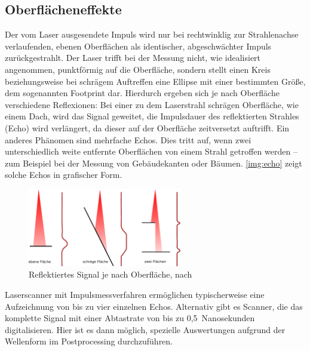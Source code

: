 \documentclass[a4paper,12pt,bibliography=totoc, listof=totoc,titlepage,pointlessnumbers]{scrreprt}
\begin{document}
\subsection{Oberflächeneffekte}
Der vom Laser ausgesendete Impuls wird nur bei rechtwinklig zur Strahlenachse verlaufenden, ebenen Oberflächen als identischer, abgeschwächter Impuls zurückgestrahlt. Der Laser trifft bei der Messung nicht, wie idealisiert angenommen, punktförmig auf die Oberfläche, sondern stellt einen Kreis beziehungsweise bei schrägem Auftreffen eine Ellipse mit einer bestimmten Größe, dem sogenannten Footprint dar. Hierdurch ergeben sich je nach Oberfläche verschiedene Reflexionen: Bei einer zu dem Laserstrahl schrägen Oberfläche, wie einem Dach, wird das Signal geweitet, die Impulsdauer des reflektierten Strahles (Echo) wird verlängert, da dieser auf der Oberfläche zeitversetzt auftrifft. Ein anderes Phänomen sind mehrfache Echos. Dies tritt auf, wenn zwei unterschiedlich weite entfernte Oberflächen von einem Strahl getroffen werden -- zum Beispiel bei der Messung von Gebäudekanten oder Bäumen. \autoref{img:echo} zeigt solche Echos in grafischer Form. \citep[S. 28]{beraldin}

\begin{figure}
 \centering
 \includegraphics[width=0.6\textwidth]{./img/echo.pdf}
 \caption{Reflektiertes Signal je nach Oberfläche, nach \citet[S. 28]{beraldin}}
 \label{img:echo}
\end{figure}

Laser\-scan\-ner mit Impulsmessverfahren ermöglichen typischerweise eine Aufzeichnung von bis zu vier einzelnen Echos. Alternativ gibt es Scanner, die das komplette Signal mit einer Abtastrate von bis zu 0,5~Nanosekunden digitalisieren. Hier ist es dann möglich, spezielle Auswertungen aufgrund der Wellenform im Postprocessing durchzuführen. \citep[S. 29]{beraldin}
\end{document}

